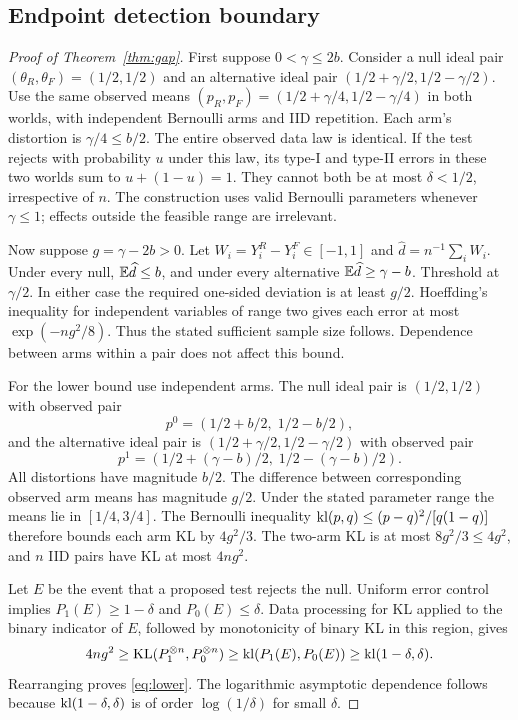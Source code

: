 \subsection{Endpoint detection boundary}
\begin{proof}[Proof of Theorem~\ref{thm:gap}]
First suppose $0<\gamma\leq2b$. Consider a null ideal pair $(\theta_R,\theta_F)=(1/2,1/2)$ and an alternative ideal pair $(1/2+\gamma/2,1/2-\gamma/2)$. Use the same observed means $(p_R,p_F)=(1/2+\gamma/4,1/2-\gamma/4)$ in both worlds, with independent Bernoulli arms and IID repetition. Each arm's distortion is $\gamma/4\leq b/2$. The entire observed data law is identical. If the test rejects with probability $u$ under this law, its type-I and type-II errors in these two worlds sum to $u+(1-u)=1$. They cannot both be at most $\delta<1/2$, irrespective of $n$. The construction uses valid Bernoulli parameters whenever $\gamma\leq1$; effects outside the feasible range are irrelevant.

Now suppose $g=\gamma-2b>0$. Let $W_i=Y_i^R-Y_i^F\in[-1,1]$ and $\widehat d=n^{-1}\sum_iW_i$. Under every null, $\mathbb E\widehat d\leq b$, and under every alternative $\mathbb E\widehat d\geq\gamma-b$. Threshold at $\gamma/2$. In either case the required one-sided deviation is at least $g/2$. Hoeffding's inequality for independent variables of range two gives each error at most $\exp(-ng^2/8)$. Thus the stated sufficient sample size follows. Dependence between arms within a pair does not affect this bound.

For the lower bound use independent arms. The null ideal pair is $(1/2,1/2)$ with observed pair
\[
 p^0=(1/2+b/2,\;1/2-b/2),
\]
and the alternative ideal pair is $(1/2+\gamma/2,1/2-\gamma/2)$ with observed pair
\[
 p^1=(1/2+(\gamma-b)/2,\;1/2-(\gamma-b)/2).
\]
All distortions have magnitude $b/2$. The difference between corresponding observed arm means has magnitude $g/2$. Under the stated parameter range the means lie in $[1/4,3/4]$. The Bernoulli inequality
$\operatorname{kl}(p,q)\leq(p-q)^2/[q(1-q)]$
therefore bounds each arm KL by $4g^2/3$. The two-arm KL is at most $8g^2/3\leq4g^2$, and $n$ IID pairs have KL at most $4ng^2$.

Let $E$ be the event that a proposed test rejects the null. Uniform error control implies $P_1(E)\geq1-\delta$ and $P_0(E)\leq\delta$. Data processing for KL applied to the binary indicator of $E$, followed by monotonicity of binary KL in this region, gives
\[
 4ng^2\geq\operatorname{KL}(P_1^{\otimes n},P_0^{\otimes n})
 \geq\operatorname{kl}(P_1(E),P_0(E))\geq\operatorname{kl}(1-\delta,\delta).
\]
Rearranging proves \eqref{eq:lower}. The logarithmic asymptotic dependence follows because $\operatorname{kl}(1-\delta,\delta)$ is of order $\log(1/\delta)$ for small $\delta$.
\end{proof}

